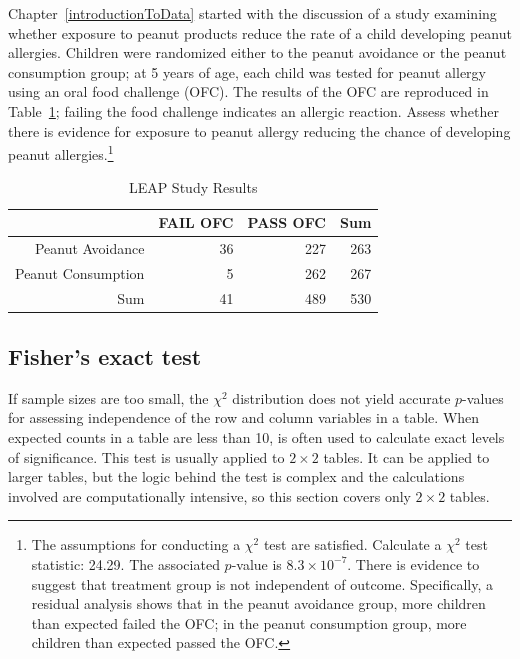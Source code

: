 \begin{exercise} Chapter~\ref{introductionToData} started with the discussion of a study examining whether exposure to peanut products reduce the rate of a child developing peanut allergies. Children were randomized either to the peanut avoidance or the peanut consumption group; at 5 years of age, each child was tested for peanut allergy using an oral food challenge (OFC). The results of the OFC are reproduced in Table~\ref{leapStudyResultsTest}; failing the food challenge indicates an allergic reaction. Assess whether there is evidence for exposure to peanut allergy reducing the chance of developing peanut allergies.\footnote{The assumptions for conducting a $\chi^2$ test are satisfied. Calculate a $\chi^2$ test statistic: 24.29. The associated $p$-value is $8.3 \times 10^{-7}$. There is evidence to suggest that treatment group is not independent of outcome. Specifically, a residual analysis shows that in the peanut avoidance group, more children than expected failed the OFC; in the peanut consumption group, more children than expected passed the OFC.}
	
	\begin{table}[h]
		\centering
		\begin{tabular}{rrrr}
			\hline
			& FAIL OFC & PASS OFC & Sum \\ 
			\hline
			Peanut Avoidance & 36 & 227 & 263 \\ 
			Peanut Consumption & 5 & 262 & 267 \\ 
			Sum & 41 & 489 & 530 \\ 
			\hline
		\end{tabular}
		\caption{LEAP Study Results} 
		\label{leapStudyResultsTest}
	\end{table}
	
	
\end{exercise}

\subsection{Fisher's exact test}

If sample sizes are too small, the $\chi^2$ distribution does not yield accurate $p$-values for  assessing  independence of the row and column variables in a table.  When expected counts in a table are less than 10,  is often  used to calculate exact levels of significance. This test is usually applied to $2 \times 2$ tables. It can be applied to larger tables, but the logic behind the test is complex and the calculations involved are computationally intensive,  so this section covers only $2 \times 2$ tables. 


